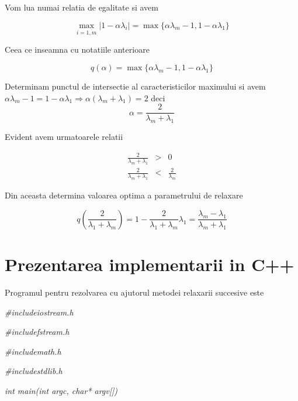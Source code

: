 \documentclass[a4paper,twoside]{book}
\begin{document}
Vom lua numai relatia de egalitate si avem

\begin{equation*}
\max_{i=\overline{1,m}}\left\vert 1-\alpha \lambda _{i}\right\vert =\max
\{\alpha \lambda _{m}-1,1-\alpha \lambda _{1}\}
\end{equation*}

Ceea ce inseamna cu notatiile anterioare

\begin{equation*}
q(\alpha )=\max \{\alpha \lambda _{m}-1,1-\alpha \lambda _{1}\}
\end{equation*}

Determinam punctul de intersectie al caracteristicilor maximului si avem $%
\alpha \lambda _{m}-1=1-\alpha \lambda _{1}\Rightarrow \alpha (\lambda
_{m}+\lambda _{1})=2$ deci%
\begin{equation*}
\alpha =\frac{2}{\lambda _{m}+\lambda _{1}}
\end{equation*}

Evident avem urmatoarele relatii

\begin{eqnarray*}
\frac{2}{\lambda _{m}+\lambda _{1}} &>&0 \\
\frac{2}{\lambda _{m}+\lambda _{1}} &<&\frac{2}{\lambda _{m}}
\end{eqnarray*}

Din aceasta determina valoarea optima a parametrului de relaxare

\begin{equation*}
q\left( \frac{2}{\lambda _{1}+\lambda _{m}}\right) =1-\frac{2}{\lambda
_{1}+\lambda _{m}}\lambda _{1}=\frac{\lambda _{m}-\lambda _{1}}{\lambda
_{m}+\lambda _{1}}
\end{equation*}

\section{Prezentarea implementarii in C++}

Programul pentru rezolvarea cu ajutorul metodei relaxarii succesive este

\textit{\#include\TEXTsymbol{<}iostream.h\TEXTsymbol{>}}

\textit{\#include\TEXTsymbol{<}fstream.h\TEXTsymbol{>}}

\textit{\#include\TEXTsymbol{<}math.h\TEXTsymbol{>}}

\textit{\#include\TEXTsymbol{<}stdlib.h\TEXTsymbol{>}}

\textit{int main(int argc, char* argv[])}
\end{document}
